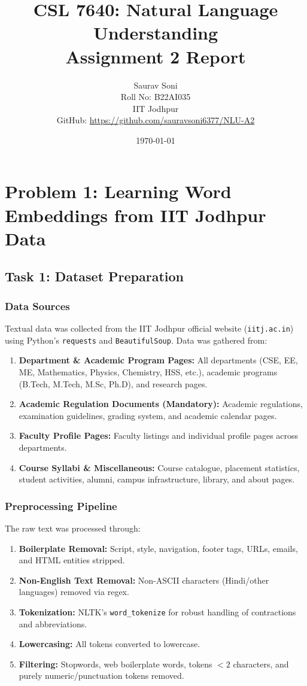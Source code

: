 \documentclass[11pt,a4paper]{article}
\title{
    \textbf{CSL 7640: Natural Language Understanding} \\[0.3em]
    \Large Assignment 2 Report
}
\author{
    Saurav Soni \\
    Roll No: B22AI035 \\
    IIT Jodhpur \\[0.3em]
    \small GitHub: \url{https://github.com/sauravsoni6377/NLU-A2}
}
\date{\today}
\begin{document}
\maketitle
\tableofcontents
\newpage

\section{Problem 1: Learning Word Embeddings from IIT Jodhpur Data}

\subsection{Task 1: Dataset Preparation}

\subsubsection{Data Sources}
Textual data was collected from the IIT Jodhpur official website (\texttt{iitj.ac.in}) using Python's \texttt{requests} and \texttt{BeautifulSoup}. Data was gathered from:
\begin{enumerate}
    \item \textbf{Department \& Academic Program Pages:} All departments (CSE, EE, ME, Mathematics, Physics, Chemistry, HSS, etc.), academic programs (B.Tech, M.Tech, M.Sc, Ph.D), and research pages.
    \item \textbf{Academic Regulation Documents (Mandatory):} Academic regulations, examination guidelines, grading system, and academic calendar pages.
    \item \textbf{Faculty Profile Pages:} Faculty listings and individual profile pages across departments.
    \item \textbf{Course Syllabi \& Miscellaneous:} Course catalogue, placement statistics, student activities, alumni, campus infrastructure, library, and about pages.
\end{enumerate}

\subsubsection{Preprocessing Pipeline}
The raw text was processed through:
\begin{enumerate}
    \item \textbf{Boilerplate Removal:} Script, style, navigation, footer tags, URLs, emails, and HTML entities stripped.
    \item \textbf{Non-English Text Removal:} Non-ASCII characters (Hindi/other languages) removed via regex.
    \item \textbf{Tokenization:} NLTK's \texttt{word\_tokenize} for robust handling of contractions and abbreviations.
    \item \textbf{Lowercasing:} All tokens converted to lowercase.
    \item \textbf{Filtering:} Stopwords, web boilerplate words, tokens $<2$ characters, and purely numeric/punctuation tokens removed.
\end{enumerate}
\end{document}
